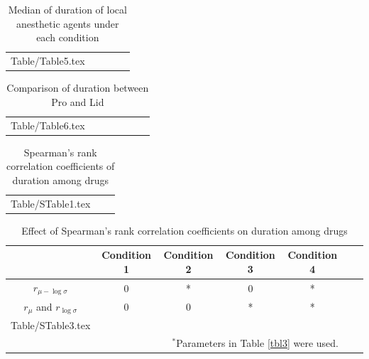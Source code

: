 \documentclass[a4paper,11pt]{article}
\makeatletter
\newcommand*\ExpandableInput[1]{\@@input#1 }
\makeatother
\begin{document}
\begin{table}[htbp]
 \caption{Median of duration of local anesthetic agents under each condition}
 \label{tbl5}
 \small
 \vspace{1ex}
 \centering
 \begin{tabular}{ccccc}
  \toprule
  \ExpandableInput{Table/Table5.tex}
 \end{tabular}
\end{table}




\begin{table}[htbp]
 \caption{Comparison of duration between Pro and Lid}
 \label{tbl6}
 \small
 \vspace{1ex}
 \centering
 \begin{tabular}{ccccccc}
  \toprule
  \ExpandableInput{Table/Table6.tex}
 \end{tabular}
\end{table}

\clearpage




\renewcommand{\figurename}{Supplementary Figure}
\renewcommand{\tablename}{Supplementary Table}
\setcounter{figure}{0}
\setcounter{table}{0}


\begin{table}[htbp]
 \caption{Spearman's rank correlation coefficients of duration among drugs}
 \label{Stbl1}
 \small
 \vspace{1ex}
 \centering
 \begin{tabular}{ccc}
  \toprule
  \ExpandableInput{Table/STable1.tex}
 \end{tabular}
\end{table}




% 
% 
% 



\begin{table}[htbp]
 \caption{Effect of Spearman's rank correlation coefficients on duration among drugs}
 \label{Stbl3}
 \small
 \vspace{1ex}
 \centering
 \begin{tabular}{ccccccc}
  \toprule
  & Condition 1 & Condition 2 & Condition 3 & Condition 4 \\
  \midrule
  $r_{\mu - \log \sigma}$         & 0 & * & 0 & * \\
  $r_{\mu}$ and $r_{\log \sigma}$ & 0 & 0 & * & * \\
  \ExpandableInput{Table/STable3.tex}

  \\[-2ex]
  \multicolumn{5}{r}{$^\text{*}$Parameters in Table \ref{tbl3} were used.} \\
 \end{tabular}
\end{table}
\end{document}
